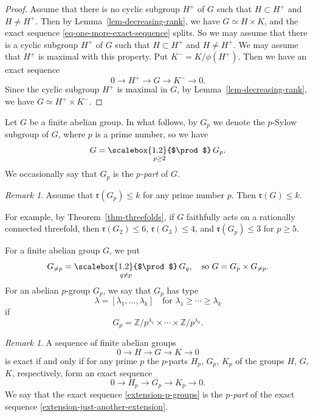 \documentclass[11pt]{amsart}
\numberwithin{equation}{section}
\newcommand*{\Scale}[2][4]{\scalebox{#1}{$#2$}}%
\theoremstyle{definition}
\theoremstyle{remark}
\newtheorem{remark}[thm]{Remark}
\newcommand{\lra}{\longrightarrow}
\begin{document}
\begin{proof}
Assume that there is no cyclic subgroup $H^+$ of $G$ such that $H\subset H^+$ and $H\neq H^+$. Then by Lemma~\ref{lem-decreasing-rank}, we have $G\simeq H\times K$, and the exact sequence \eqref{eq-one-more-exact-sequence} splits. So we may assume that there is a cyclic subgroup $H^+$ of $G$ such that $H\subset H^+$ and $H\neq H^+$. We may assume that $H^+$ is maximal with this property. 
Put $K^-=K/\phi(H^+)$. 
Then we have an exact sequence
\[
0 \lra H^+ \lra G \lra K^- \lra 0.
\]
Since the cyclic subgroup $H^+$ is maximal in $G$, by Lemma~\ref{lem-decreasing-rank}, we have $G\simeq H^+\times K^-$. 
\end{proof}

Let $G$ be a finite abelian group. 
In what follows, by $G_p$ we denote the $p$-Sylow subgroup of $G$, where $p$ is a prime number, so we have
\[
G=\mathop{\Scale[1.2]{\prod}}_{p\geq 2} G_p.
\]
We occasionally say that $G_p$ is the \emph{$p$-part} of $G$.  

\begin{remark}
Assume that $\mathfrak{r}(G_p)\leq k$ for any prime number $p$. Then $\mathfrak{r}(G)\leq k$.
\end{remark}

For example, by Theorem~\ref{thm-threefolds}, if $G$ faithfully acts on a rationally connected threefold, then $\mathfrak{r}(G_2)\leq 6$, $\mathfrak{r}(G_3)\leq 4$, and $\mathfrak{r}(G_p)\leq 3$ for $p\geq 5$. 

For a finite abelian group $G$, we put 
\[
G_{\neq p}=\mathop{\Scale[1.2]{\prod}}_{q\neq p} G_q, \quad \text{so }  G = G_p\times G_{\neq p}. 
\]
For an abelian $p$-group $G_p$, we say that $G_p$ has type 
\[
\lambda=[\lambda_1,\ldots,\lambda_k] \quad \text{for }  \lambda_1\geq\cdots\geq \lambda_k
\]
if 
\[
G_p=\mathbb{Z}/p^{\lambda_1}\times\cdots\times\mathbb{Z}/p^{\lambda_k}.
\]
\begin{remark}
\label{rem-pass-to-p-part}
A sequence of finite abelian groups 
\begin{equation}
\label{extension-just-another-extension}
0\lra H\lra G\lra K \lra 0
\end{equation}
is exact if and only if for any prime $p$ the $p$-parts $H_p$, $G_p$, $K_p$ of the groups $H$, $G$, $K$, respectively, form an exact sequence
\begin{equation}
\label{extension-p-groups}
0\lra H_p\lra G_p\lra K_p \lra 0.
\end{equation}
We say that the exact sequence \eqref{extension-p-groups} is the \emph{$p$-part} of the exact sequence \eqref{extension-just-another-extension}.
\end{remark}
\end{document}
